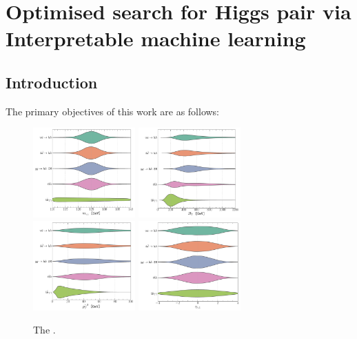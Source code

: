 
\chapter{ Optimised search for Higgs pair via Interpretable machine learning }\label{chap:overviewLightYuk}
\section{Introduction}
\label{sec:Intro}


The primary objectives of this work are as follows:
\begin{figure}[t]
	\centering
	\includegraphics[width=0.35\textwidth]{fig/shape-MAA} 	\hspace*{0.25 cm}
	\includegraphics[width=0.35\textwidth]{fig/shape-HT}  \\
		\includegraphics[width=0.35\textwidth]{fig/shape-PTA2} \hspace*{0.25 cm}
		\includegraphics[width=0.35\textwidth]{fig/shape-ETAa1} 
	\caption{The . }
	\label{fig:voilen}
\end{figure}  

